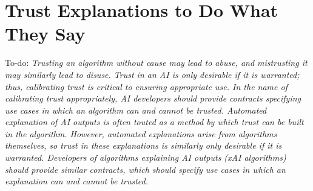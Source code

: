 \section{Trust Explanations to Do What They Say} %
To-do: \emph{Trusting an algorithm without cause may lead to abuse, and mistrusting it may similarly lead to disuse. Trust in an AI is only desirable if it is warranted; thus, calibrating trust is critical to ensuring appropriate use. In the name of calibrating trust appropriately, AI developers should provide contracts specifying use cases in which an algorithm can and cannot be trusted. Automated explanation of AI outputs is often touted as a method by which trust can be built in the algorithm. However, automated explanations arise from algorithms themselves, so trust in these explanations is similarly only desirable if it is warranted. Developers of algorithms explaining AI outputs (xAI algorithms) should provide similar contracts, which should specify use cases in which an explanation can and cannot be trusted.}


